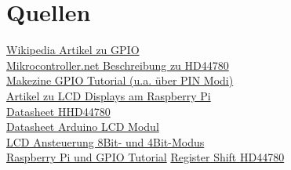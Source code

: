 \documentclass[a4paper,11pt]{article}
\begin{document}
\section*{Quellen}
\href{https://en.wikipedia.org/wiki/General-purpose_input/output}{Wikipedia Artikel zu GPIO}\\
\href{http://www.mikrocontroller.net/articles/HD44780}{Mikrocontroller.net Beschreibung zu HD44780}\\
\href{http://makezine.com/projects/tutorial-raspberry-pi-gpio-pins-and-python/}{Makezine GPIO Tutorial (u.a. über PIN Modi)}\\
\href{https://projects.drogon.net/raspberry-pi/gpio-examples/lcd-interface/}{Artikel zu LCD Displays am Raspberry Pi}\\
\href{https://www.sparkfun.com/datasheets/LCD/HD44780.pdf}{Datasheet HHD44780}\\
\href{http://www.protostack.com/download/YJD1602A-1\%20datasheet.pdf}{Datasheet Arduino LCD Modul}\\
\href{http://www.protostack.com/blog/2010/03/character-lcd-displays-part-1/}{LCD Ansteuerung 8Bit- und 4Bit-Modus}\\
\href{http://openmicros.org/index.php/articles/94-ciseco-product-documentation/raspberry-pi/217-getting-started-with-raspberry-pi-gpio-and-python}{Raspberry Pi und GPIO Tutorial}
\href{http://www.learningaboutelectronics.com/Articles/HD44780-LCD-register-select-RS-pin}{Register Shift HD44780}
\end{document}
